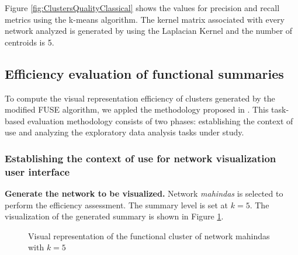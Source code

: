 \documentclass{ieeeaccess}
\begin{document}
Figure \ref{fig:ClustersQualityClassical} shows the values for precision and recall
metrics using the k-means algorithm. The kernel matrix associated with every network analyzed
is generated by using the Laplacian Kernel and the number of centroids is 5.




\subsection{Efficiency evaluation of functional summaries}
To compute the visual representation efficiency of clusters
generated by the modified FUSE algorithm, we appled the methodology
proposed in \cite{Camarillo20}. This task-based evaluation methodology 
consists of two phases: establishing the context of use and analyzing
the exploratory data analysis tasks under study.



\subsubsection{Establishing the context of use for network visualization user interface}
\textbf{Generate the network to be visualized.} Network \textit{mahindas} is selected to perform the
efficiency assessment. The summary level is set at $k = 5$. The visualization of
the generated summary is shown in Figure \ref{Fig:Vis_1}.

\begin{figure}[h!]
    \centering
     
     \caption{Visual representation of the functional cluster of network mahindas with $k=5$}
     \label{Fig:Vis_1}
\end{figure}
\end{document}
